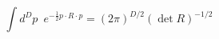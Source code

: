 \begin{equation}\label{p0}
    \int d^Dp\,\,\,
        e^{-\frac{1}{2}p\cdot R \cdot p}
        =
        (2\pi)^{D/2}(\det R)^{-1/2}
\end{equation}

